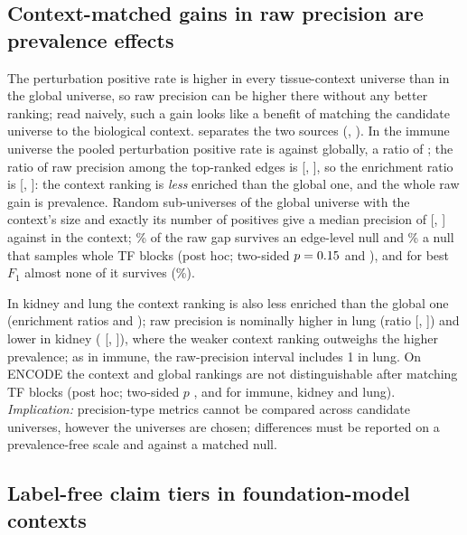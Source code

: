 \subsection{Context-matched gains in raw precision are prevalence effects}\label{sec:res-universe}

The perturbation positive rate is higher in every tissue-context universe than in the global universe, so raw precision can be higher there without any better ranking; read naively, such a gain looks like a benefit of matching the candidate universe to the biological context.
 separates the two sources (, ).
In the immune universe the pooled perturbation positive rate is \nUniBaseImm{} against \nUniBaseGlob{} globally, a ratio of \nUniBr{}; the ratio of raw precision among the \nEvalK{} top-ranked edges is \nUniRaw{} [\nUniRawLo{}, \nUniRawHi{}], so the enrichment ratio is \nUniEnr{} [\nUniEnrLo{}, \nUniEnrHi{}]: the context ranking is \emph{less} enriched than the global one, and the whole raw gain is prevalence.
Random sub-universes of the global universe with the context's size and exactly its number of positives give a median precision of \nUniNull{} [\nUniNullLo{}, \nUniNullHi{}] against \nUniCtx{} in the context; \nUniSurvEdge{}\% of the raw gap survives an edge-level null and \nUniSurvBlock{}\% a null that samples whole TF blocks (post hoc; two-sided $p=0.15{}$ and \nUniPBlock{}), and for best $F_1$ almost none of it survives (\nUniFOneSurv{}\%).


In kidney and lung the context ranking is also less enriched than the global one (enrichment ratios \nUniEnrKid{} and \nUniEnrLung{}); raw precision is nominally higher in lung (ratio \nUniRawLung{} [\nUniRawLungLo{}, \nUniRawLungHi{}]) and lower in kidney (\nUniRawKid{} [\nUniRawKidLo{}, \nUniRawKidHi{}]), where the weaker context ranking outweighs the higher prevalence; as in immune, the raw-precision interval includes 1 in lung.
On ENCODE the context and global rankings are not distinguishable after matching TF blocks (post hoc; two-sided $p$ \nUniEncPImm{}, \nUniEncPKid{} and \nUniEncPLung{} for immune, kidney and lung).
\emph{Implication:} precision-type metrics cannot be compared across candidate universes, however the universes are chosen; differences must be reported on a prevalence-free scale and against a matched null.


\subsection{Label-free claim tiers in foundation-model contexts}\label{sec:res-governance}

